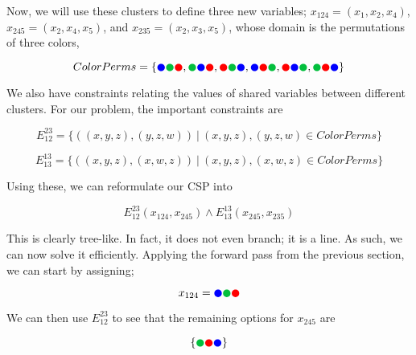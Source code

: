 Now, we will use these clusters to define three new variables; $x_{124} = (x_1, x_2, x_4)$, $x_{245} = (x_2, x_4, x_5)$, and $x_{235} = (x_2, x_3, x_5)$, whose domain is the permutations of three colors,

\begin{equation}
    ColorPerms =
    \{{\color{blue}\CIRCLE} {\color{darkgreen}\CIRCLE} {\color{red}\CIRCLE}, 
    {\color{darkgreen}\CIRCLE} {\color{blue}\CIRCLE} {\color{red}\CIRCLE},
    {\color{red}\CIRCLE} {\color{darkgreen}\CIRCLE} {\color{blue}\CIRCLE},
    {\color{blue}\CIRCLE} {\color{red}\CIRCLE} {\color{darkgreen}\CIRCLE}, 
    {\color{red}\CIRCLE} {\color{blue}\CIRCLE} {\color{darkgreen}\CIRCLE},
    {\color{darkgreen}\CIRCLE} {\color{red}\CIRCLE} {\color{blue}\CIRCLE}
    \}
\end{equation}

We also have constraints relating the values of shared variables between different clusters. For our problem, the important constraints are

\begin{equation}
    E^{23}_{12} = \{((x, y, z), (y, z, w))\ |\ (x, y, z), (y, z, w) \in ColorPerms\}
\end{equation}

\begin{equation}
    E^{13}_{13} = \{((x, y, z), (x, w, z))\ |\ (x, y, z), (x, w, z) \in ColorPerms\}
\end{equation}

Using these, we can reformulate our CSP into

\begin{equation}
    E^{23}_{12}(x_{124}, x_{245}) \wedge E^{13}_{13}(x_{245}, x_{235})
\end{equation}

This is clearly tree-like. In fact, it does not even branch; it is a line. As such, we can now solve it efficiently. Applying the forward pass from the previous section, we can start by assigning;

\begin{equation}
    x_{124} = {\color{blue}\CIRCLE} {\color{darkgreen}\CIRCLE} {\color{red}\CIRCLE}
\end{equation}

We can then use $E^{23}_{12}$ to see that the remaining options for $x_{245}$ are

\begin{equation}
    \{{\color{darkgreen}\CIRCLE} {\color{red}\CIRCLE} {\color{blue}\CIRCLE}
    \}
\end{equation}

